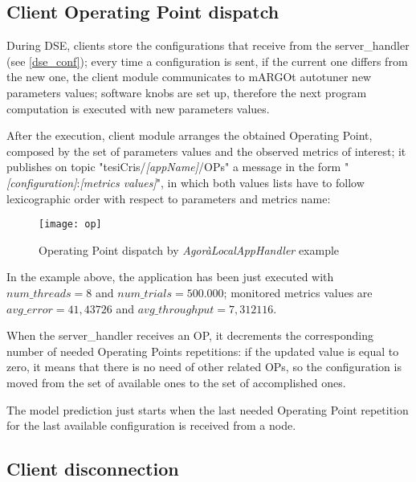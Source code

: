 \subsection{Client Operating Point dispatch}\label{opSend}

During DSE, clients store the configurations that receive from the ser\-ver\_han\-dler (see \ref{dse_conf}); every time a configuration is sent, if the current one differs from the new one, the client module communicates to mARGOt autotuner new parameters values; software knobs are set up, therefore the next program computation is executed with new parameters values.

After the execution, client module arranges the obtained Operating Point, composed by the set of parameters values and the observed metrics of interest; it publishes on topic "tesiCris/\textit{[appName]}/OPs" a message in the form "\textit{[configuration]}:\textit{[metrics values]}", in which both values lists have to follow lexicographic order with respect to parameters and metrics name:

\begin{figure}[H]

    \centering
    \texttt{[image: op]}
    \caption{Operating Point dispatch by \textit{AgoràLocalAppHandler} example}
    \label{fig:op}
    
\end{figure}

In the example above, the application has been just executed with\linebreak $num\_threads = 8$ and $num\_trials = 500.000$; monitored metrics values are $avg\_error = 41,43726$ and $avg\_throughput = 7,312116$.

When the server\_handler receives an OP, it decrements the corresponding number of needed Operating Points repetitions: if the updated value is equal to zero, it means that there is no need of other related OPs, so the configuration is moved from the set of available ones to the set of accomplished ones.

The model prediction just starts when the last needed Operating Point repetition for the last available configuration is received from a node.





\subsection{Client disconnection}\label{client_disc}

